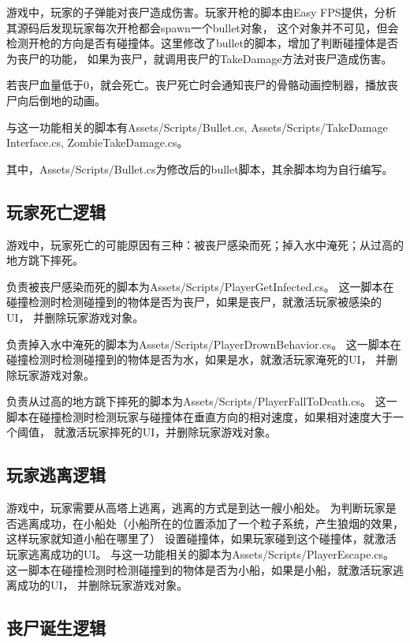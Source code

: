 \documentclass{article}
\begin{document}
游戏中，玩家的子弹能对丧尸造成伤害。玩家开枪的脚本由Easy FPS提供，分析其源码后发现玩家每次开枪都会spawn一个bullet对象，
这个对象并不可见，但会检测开枪的方向是否有碰撞体。这里修改了bullet的脚本，增加了判断碰撞体是否为丧尸的功能，
如果为丧尸，就调用丧尸的TakeDamage方法对丧尸造成伤害。

若丧尸血量低于0，就会死亡。丧尸死亡时会通知丧尸的骨骼动画控制器，播放丧尸向后倒地的动画。

与这一功能相关的脚本有Assets/Scripts/Bullet.cs,
Assets/Scripts/TakeDamage Interface.cs,
ZombieTakeDamage.cs。

其中，Assets/Scripts/Bullet.cs为修改后的bullet脚本，其余脚本均为自行编写。

\subsection{玩家死亡逻辑}

游戏中，玩家死亡的可能原因有三种：被丧尸感染而死；掉入水中淹死；从过高的地方跳下摔死。

负责被丧尸感染而死的脚本为Assets/Scripts/PlayerGetInfected.cs。
这一脚本在碰撞检测时检测碰撞到的物体是否为丧尸，如果是丧尸，就激活玩家被感染的UI，
并删除玩家游戏对象。

负责掉入水中淹死的脚本为Assets/Scripts/PlayerDrownBehavior.cs。
这一脚本在碰撞检测时检测碰撞到的物体是否为水，如果是水，就激活玩家淹死的UI，
并删除玩家游戏对象。

负责从过高的地方跳下摔死的脚本为Assets/Scripts/PlayerFallToDeath.cs。
这一脚本在碰撞检测时检测玩家与碰撞体在垂直方向的相对速度，如果相对速度大于一个阈值，
就激活玩家摔死的UI，并删除玩家游戏对象。

\subsection{玩家逃离逻辑}

游戏中，玩家需要从高塔上逃离，逃离的方式是到达一艘小船处。
为判断玩家是否逃离成功，在小船处（小船所在的位置添加了一个粒子系统，产生狼烟的效果，这样玩家就知道小船在哪里了）
设置碰撞体，如果玩家碰到这个碰撞体，就激活玩家逃离成功的UI。
与这一功能相关的脚本为Assets/Scripts/PlayerEscape.cs。
这一脚本在碰撞检测时检测碰撞到的物体是否为小船，如果是小船，就激活玩家逃离成功的UI，
并删除玩家游戏对象。

\subsection{丧尸诞生逻辑}
\end{document}
